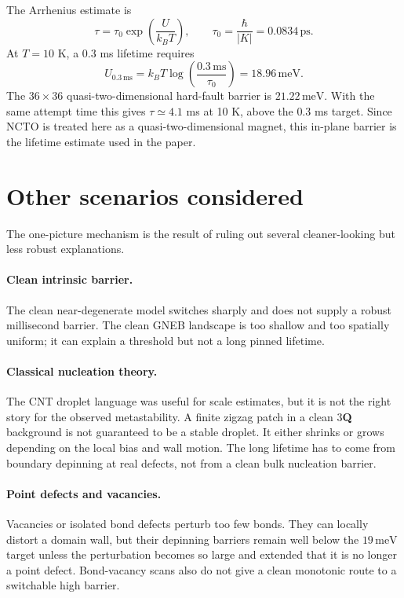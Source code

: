 \documentclass[aps,prb,twocolumn,superscriptaddress,floatfix,nofootinbib]{revtex4-2}
\newcommand{\threeQ}{3\textbf{Q}}
\newcommand{\meV}{\,\mathrm{meV}}
\begin{document}
The Arrhenius estimate is
\begin{equation}
\tau=\tau_0\exp\left(\frac{U}{k_B T}\right),\qquad
\tau_0=\frac{\hbar}{|K|}=0.0834\,\mathrm{ps}.
\end{equation}
At $T=10$ K, a $0.3$ ms lifetime requires
\begin{equation}
U_{0.3\,\mathrm{ms}}=k_B T\log\left(\frac{0.3\,\mathrm{ms}}{\tau_0}\right)
=18.96\meV.
\end{equation}
The $36\times36$ quasi-two-dimensional hard-fault barrier is $21.22\meV$.  With
the same attempt time this gives $\tau\simeq4.1$ ms at 10 K, above the $0.3$ ms
target.  Since NCTO is treated here as a quasi-two-dimensional magnet, this
in-plane barrier is the lifetime estimate used in the paper.

\section{Other scenarios considered}

The one-picture mechanism is the result of ruling out several cleaner-looking
but less robust explanations.

\paragraph{Clean intrinsic barrier.}
The clean near-degenerate model switches sharply and does not supply a robust
millisecond barrier.  The clean GNEB landscape is too shallow and too spatially
uniform; it can explain a threshold but not a long pinned lifetime.

\paragraph{Classical nucleation theory.}
The CNT droplet language was useful for scale estimates, but it is not the right
story for the observed metastability.  A finite zigzag patch in a clean \threeQ{}
background is not guaranteed to be a stable droplet.  It either shrinks or grows
depending on the local bias and wall motion.  The long lifetime has to come from
boundary depinning at real defects, not from a clean bulk nucleation barrier.

\paragraph{Point defects and vacancies.}
Vacancies or isolated bond defects perturb too few bonds.  They can locally
distort a domain wall, but their depinning barriers remain well below the
$19\meV$ target unless the perturbation becomes so large and extended that it is
no longer a point defect.  Bond-vacancy scans also do not give a clean monotonic
route to a switchable high barrier.
\end{document}
